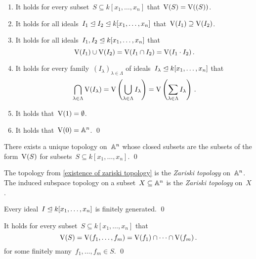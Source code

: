 \begin{lemma}
  \label{properties of vanishing sets}
  \leavevmode
  \begin{enumerate}
    \item
      It holds for every subset~$S \subseteq k[x_1, \dotsc, x_n]$ that~$\operatorname{V}(S) = \operatorname{V}( (S) )$.
    \item
      It holds for all ideals~$I_1 \trianglelefteq I_2 \trianglelefteq k[x_1, \dotsc, x_n]$ that~$\operatorname{V}(I_1) \supseteq \operatorname{V}(I_2)$.
    \item
      It holds for all ideals~$I_1, I_2 \trianglelefteq k[x_1, \dotsc, x_n]$ that
      \[
          \operatorname{V}(I_1) \cup \operatorname{V}(I_2)
        = \operatorname{V}(I_1 \cap I_2)
        = \operatorname{V}(I_1 \cdot I_2) \,.
      \]
    \item
      It holds for every family~$(I_\lambda)_{\lambda \in \Lambda}$ of ideals~$I_\lambda \trianglelefteq k[x_1, \dotsc, x_n]$ that
      \[
          \bigcap_{\lambda \in \Lambda} \operatorname{V}(I_\lambda)
        = \operatorname{V}\left( \bigcup_{\lambda \in \Lambda} I_\lambda \right)
        = \operatorname{V}\left( \sum_{\lambda \in \Lambda} I_\lambda \right) \,.
      \]
    \item
      It holds that~$\operatorname{V}(1) = \emptyset$.
    \item
      It holds that~$\operatorname{V}(0) = \mathbb{A}^n$.
    \qed
  \end{enumerate}
\end{lemma}


\begin{corollary}
  \label{existence of zariski topology}
  There exists a unique topology on~$\mathbb{A}^n$ whose closed subsets are the subsets of the form~$\operatorname{V}(S)$ for subsets~$S \subseteq k[x_1, \dotsc, x_n]$.
  \qed
\end{corollary}


\begin{definition}
  The topology from \cref{existence of zariski topology} is the \emph{Zariski topology} on~$\mathbb{A}^n$.
  The induced subspace topology on a subset~$X \subseteq \mathbb{A}^n$ is the \emph{Zariski topology} on~$X$.
\end{definition}


\begin{theorem}
  Every ideal~$I \trianglelefteq k[x_1, \dotsc, x_n]$ is finitely generated.
  \qed
\end{theorem}


\begin{corollary}
  It holds for every subset~$S \subseteq k[x_1, \dotsc, x_n]$ that
  \[
      \operatorname{V}(S)
    = \operatorname{V}(f_1, \dotsc, f_m)
    = \operatorname{V}(f_1) \cap \dotsb \cap \operatorname{V}(f_m) \,.
  \]
  for some finitely many~$f_1, \dotsc, f_m \in S$.
  \qed
\end{corollary}





